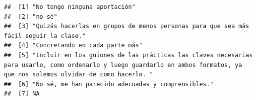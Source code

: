 \documentclass[
]{article}
\begin{document}
\begin{verbatim}
##  [1] "No tengo ninguna aportación"                                                                                                                                                                                                                                                                                                                                                                        
##  [2] "no sé"                                                                                                                                                                                                                                                                                                                                                                                              
##  [3] "Quizás hacerlas en grupos de menos personas para que sea más fácil seguir la clase."                                                                                                                                                                                                                                                                                                                
##  [4] "Concretando en cada parte más"                                                                                                                                                                                                                                                                                                                                                                      
##  [5] "Incluir en los guiones de las prácticas las claves necesarias para usarlo, como ordenarlo y luego guardarlo en ambos formatos, ya que nos solemos olvidar de como hacerlo. "                                                                                                                                                                                                                        
##  [6] "No sé, me han parecido adecuadas y comprensibles."                                                                                                                                                                                                                                                                                                                                                  
##  [7] NA                                                                                                                                                                                                                                                                                                                                                                                                   

\end{verbatim}
\end{document}
